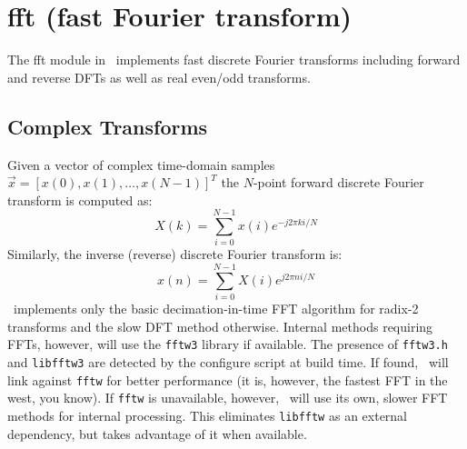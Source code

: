 % 
%

\newpage
\section{fft (fast Fourier transform)}
\label{module:fft}
%
The fft module in \liquid\ implements fast discrete Fourier transforms
including forward and reverse DFTs as well as real even/odd transforms.

\subsection{Complex Transforms}
\label{module:fft:dft}
Given a vector of complex time-domain samples
$\vec{x} = \left[x(0),x(1),\ldots,x(N-1)\right]^T$
the $N$-point forward discrete Fourier transform is computed as:
%
\begin{equation}
\label{eqn:fft:dft}
    X(k) = \sum_{i=0}^{N-1}{x(i) e^{-j 2 \pi k i/N}}
\end{equation}
%
Similarly, the inverse (reverse) discrete Fourier transform is:
\begin{equation}
\label{eqn:fft:idft}
    x(n) = \sum_{i=0}^{N-1}{X(i) e^{ j 2 \pi n i/N}}
\end{equation}
%
\liquid\ implements only the basic decimation-in-time FFT algorithm for
radix-2 transforms and the slow DFT method otherwise.
Internal methods requiring FFTs, however, will use the {\tt fftw3}
library \cite{fftw:web} if available.
The presence of {\tt fftw3.h} and {\tt libfftw3} are detected by the
configure script at build time.
If found, \liquid\ will link against {\tt fftw} for better performance
(it is, however, the fastest FFT in the west, you know).
If {\tt fftw} is unavailable, however, \liquid\ will use its own, slower
FFT methods for internal processing.
This eliminates {\tt libfftw} as an external dependency, but takes
advantage of it when available.

